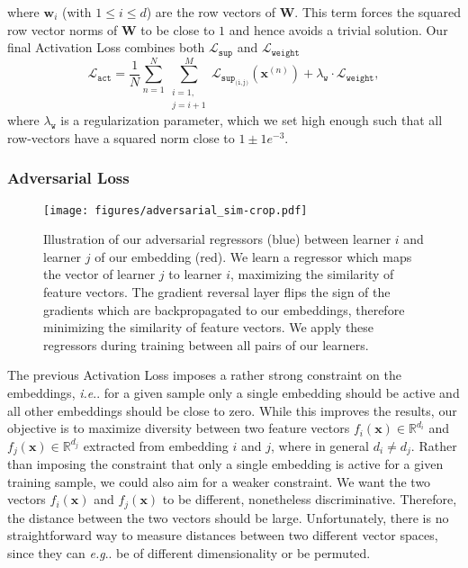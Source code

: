 \documentclass[10pt,journal,compsoc]{IEEEtran}
\makeatletter
\DeclareRobustCommand\onedot{\futurelet\@let@token\@onedot}
\def\@onedot{\ifx\@let@token.\else.\null\fi\xspace}
\def\eg{\emph{e.g}\onedot} \def\Eg{\emph{E.g}\onedot}
\def\ie{\emph{i.e}\onedot} \def\Ie{\emph{I.e}\onedot}
\makeatother
\begin{document}
where $\boldsymbol{w}_i$ (with ${1 \le i \le d}$) are the row vectors of $\boldsymbol{W}$. This term forces the squared row vector norms of $\boldsymbol{W}$ to be close to $1$ and hence avoids a trivial solution.
Our final Activation Loss combines both $\mathcal{L}_{\texttt{sup}}$ and $\mathcal{L}_{\texttt{weight}}$\begin{equation}
    \label{eq:loss-act}
    \mathcal{L}_{\texttt{act}} = \frac{1}{N} \sum_{n=1}^N \sum_{\substack{i = 1, \\ j = i + 1}}^M \mathcal{L}_{\texttt{sup}_\texttt{(i,j)}}(\boldsymbol{x}^{(n)}) + \lambda_{\texttt{w}} \cdot \mathcal{L}_{\texttt{weight}}, 
\end{equation}
where $\lambda_{\texttt{w}}$ is a regularization parameter, which we set high enough such that all row-vectors have a squared norm close to ${1 \pm 1e^{-3}}$. 

\subsubsection{Adversarial Loss}\label{sec:adversarial-loss}\begin{figure}[t]
    \begin{center}
    \texttt{[image: figures/adversarial\_sim-crop.pdf]}
    \end{center}
    \caption{Illustration of our adversarial regressors (blue) between learner $i$ and learner $j$ of our embedding (red). We learn a regressor which maps the vector of learner $j$ to learner $i$, maximizing the similarity of feature vectors. 
    The gradient reversal layer flips the sign of the gradients which are backpropagated to our embeddings, therefore minimizing the similarity of feature vectors. We apply these regressors during training between all pairs of our learners.}
    \label{fig:adversarial-regressors}
\end{figure}

The previous Activation Loss imposes a rather strong constraint on the embeddings, \ie for a given sample only a single embedding should be active and all other embeddings
should be close to zero.
While this improves the results, our objective is to maximize diversity between two 
feature vectors $f_i(\boldsymbol{x}) \in \mathbb{R}^{d_i}$ and $f_j(\boldsymbol{x}) \in \mathbb{R}^{d_j}$ extracted from embedding $i$ and $j$, 
where in general $d_i \neq d_j$. Rather than imposing the constraint that only a single embedding is active for a given 
training sample, we could also aim for a weaker constraint. 
We want the two vectors $f_i(\boldsymbol{x})$ and $f_j(\boldsymbol{x})$ to be different, nonetheless discriminative. Therefore, the distance
between the two vectors should be large. Unfortunately, there is no straightforward way to measure distances between two different vector spaces, since they
can \eg be of different dimensionality or be permuted.
\end{document}
